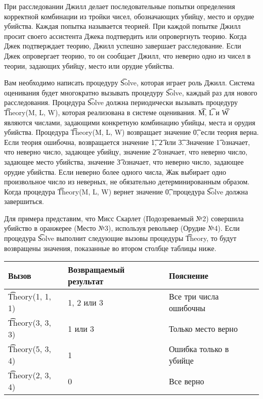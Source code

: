 При расследовании Джилл делает последовательные попытки определения корректной
комбинации из тройки чисел, обозначающих убийцу, место и орудие убийства. Каждая
попытка называется теорией. При каждой попытке Джилл просит своего ассистента
Джека подтвердить или опровергнуть теорию. Когда Джек подтверждает теорию, Джилл
успешно завершает расследование. Если Джек опровергает теорию, то он сообщает
Джилл, что неверно одно из чисел в теории, задающих убийцу, место или орудие
убийства.

Вам необходимо написать процедуру \t{Solve}, которая играет роль Джилл. Система
оценивания будет многократно вызывать процедуру \t{Solve}, каждый раз для нового
расследования. Процедура \t{Solve} должна периодически вызывать процедуру
\t{Theory(M, L, W)}, которая реализована в системе оценивания. \t{M}, \t{L} и \t{W} являются числами,
задающими конкретную комбинацию убийцы, места и орудия убийства. Процедура
\t{Theory(M, L, W)} возвращает значение \t{0}, если теория верна. Если теория ошибочна,
возвращается значение \t{1}, \t{2} или \t{3}. Значение \t{1} означает, что неверно число, задающее
убийцу, значение \t{2} означает, что неверно число, задающее место убийства, значение \t{3}
означает, что неверно число, задающее орудие убийства. Если неверно более одного
числа, Жак выбирает одно произвольное число из неверных, не обязательно
детерминированным образом. Когда процедура \t{Theory(M, L, W)} вернет значение \t{0},
процедура \t{Solve} должна завершиться. 

Для примера представим, что Мисс Скарлет (Подозреваемый №2) совершила убийство в
оранжерее (Место №3), используя револьвер (Орудие №4). Если процедура \t{Solve}
выполнит следующие вызовы процедуры \t{Theory}, то будут возвращены значения,
показанные во втором столбце таблицы ниже. 

\begin{tabular}{|l|l|l|}
\hline
Вызов & Возвращаемый результат & Пояснение \\ \hline
\t{Theory(1, 1, 1)} & 1, 2 или 3 & Все три числа ошибочны \\
\t{Theory(3, 3, 3)} & 1 или 3 & Только место верно \\
\t{Theory(5, 3, 4)} & 1 & Ошибка только в убийце \\
\t{Theory(2, 3, 4)} & 0 & Все верно \\ \hline
\end{tabular}
